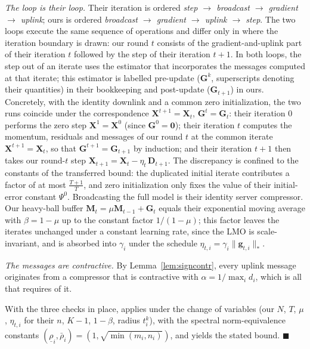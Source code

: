 \documentclass{article}
\begin{document}
\emph{The loop is their loop.} Their iteration is ordered \emph{step $\to$ broadcast $\to$ gradient $\to$ uplink}; ours is ordered \emph{broadcast $\to$ gradient $\to$ uplink $\to$ step}. The two loops execute the same sequence of operations and differ only in where the iteration boundary is drawn: our round $t$ consists of the gradient-and-uplink part of their iteration $t$ followed by the step of their iteration $t+1$. In both loops, the step out of an iterate uses the estimator that incorporates the messages computed at that iterate; this estimator is labelled pre-update ($\mathbf{G}^k$, superscripts denoting their quantities) in their bookkeeping and post-update ($\mathbf{G}_{t+1}$) in ours. Concretely, with the identity downlink and a common zero initialization, the two runs coincide under the correspondence $\mathbf{X}^{t+1} = \mathbf{X}_t$, $\mathbf{G}^{t} = \mathbf{G}_t$: their iteration $0$ performs the zero step $\mathbf{X}^1 = \mathbf{X}^0$ (since $\mathbf{G}^0 = \mathbf{0}$); their iteration $t$ computes the momentum, residuals and messages of our round $t$ at the common iterate $\mathbf{X}^{t+1} = \mathbf{X}_t$, so that $\mathbf{G}^{t+1} = \mathbf{G}_{t+1}$ by induction; and their iteration $t+1$ then takes our round-$t$ step $\mathbf{X}_{t+1} = \mathbf{X}_t - \eta_t\,\mathbf{D}_{t+1}$. The discrepancy is confined to the constants of the transferred bound: the duplicated initial iterate contributes a factor of at most $\tfrac{T+1}{T}$, and zero initialization only fixes the value of their initial-error constant $\Psi^0$. Broadcasting the full model is their identity server compressor. Our heavy-ball buffer $\mathbf{M}_t = \mu\mathbf{M}_{t-1} + \mathbf{G}_t$ equals their exponential moving average with $\beta = 1-\mu$ up to the constant factor $1/(1-\mu)$; this factor leaves the iterates unchanged under a constant learning rate, since the LMO is scale-invariant, and is absorbed into $\gamma_i$ under the schedule $\eta_{t,i} = \gamma_i\|\mathbf{g}_{t,i}\|_{*}$.

\emph{The messages are contractive.} By Lemma~\ref{lem:signcontr}, every uplink message originates from a compressor that is contractive with $\alpha = 1/\max_i d_i$, which is all that \citet[Definition~1]{gruntkowska2025error} requires of it.

With the three checks in place, \citet[Theorem~19]{gruntkowska2025error} applies under the change of variables (our $N$, $T$, $\mu$, $\eta_{t,i}$ for their $n$, $K-1$, $1-\beta$, radius $t_i^k$), with the spectral norm-equivalence constants $(\underline{\rho}_i,\bar{\rho}_i) = (1, \sqrt{\min(m_i,n_i)})$, and yields the stated bound. $\blacksquare$
\end{document}
